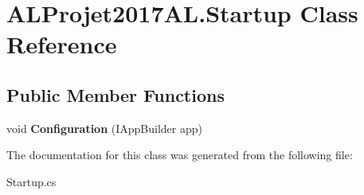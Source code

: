 \hypertarget{class_a_l_projet2017_a_l_1_1_startup}{}\section{A\+L\+Projet2017\+A\+L.\+Startup Class Reference}
\label{class_a_l_projet2017_a_l_1_1_startup}
\subsection*{Public Member Functions}
\begin{DoxyCompactItemize}
\item 
void {\bfseries Configuration} (I\+App\+Builder app)\hypertarget{class_a_l_projet2017_a_l_1_1_startup_a15fe90123f2b5a8e5b8e3c2294391500}{}\label{class_a_l_projet2017_a_l_1_1_startup_a15fe90123f2b5a8e5b8e3c2294391500}

\end{DoxyCompactItemize}


The documentation for this class was generated from the following file\+:\begin{DoxyCompactItemize}
\item 
Startup.\+cs\end{DoxyCompactItemize}
